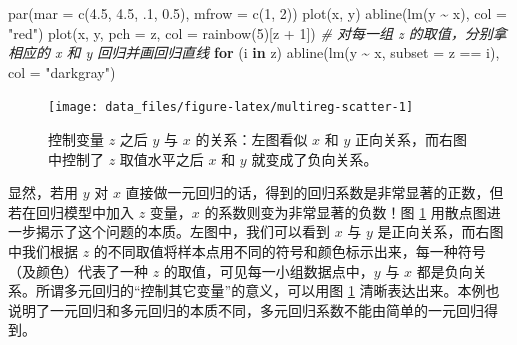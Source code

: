 \documentclass[
  b5paper,
  UTF8,twoside]{book}
\newenvironment{Shaded}{\begin{snugshade}}{\end{snugshade}}
\newcommand{\AttributeTok}[1]{\textcolor[rgb]{0.77,0.63,0.00}{#1}}
\newcommand{\CommentTok}[1]{\textcolor[rgb]{0.56,0.35,0.01}{\textit{#1}}}
\newcommand{\ControlFlowTok}[1]{\textcolor[rgb]{0.13,0.29,0.53}{\textbf{#1}}}
\newcommand{\DecValTok}[1]{\textcolor[rgb]{0.00,0.00,0.81}{#1}}
\newcommand{\FloatTok}[1]{\textcolor[rgb]{0.00,0.00,0.81}{#1}}
\newcommand{\FunctionTok}[1]{\textcolor[rgb]{0.00,0.00,0.00}{#1}}
\newcommand{\NormalTok}[1]{#1}
\newcommand{\SpecialCharTok}[1]{\textcolor[rgb]{0.00,0.00,0.00}{#1}}
\newcommand{\StringTok}[1]{\textcolor[rgb]{0.31,0.60,0.02}{#1}}
\begin{document}
\begin{Shaded}
\begin{Highlighting}[]
\FunctionTok{par}\NormalTok{(}\AttributeTok{mar =} \FunctionTok{c}\NormalTok{(}\FloatTok{4.5}\NormalTok{, }\FloatTok{4.5}\NormalTok{, .}\DecValTok{1}\NormalTok{, }\FloatTok{0.5}\NormalTok{), }\AttributeTok{mfrow =} \FunctionTok{c}\NormalTok{(}\DecValTok{1}\NormalTok{, }\DecValTok{2}\NormalTok{))}
\FunctionTok{plot}\NormalTok{(x, y)}
\FunctionTok{abline}\NormalTok{(}\FunctionTok{lm}\NormalTok{(y }\SpecialCharTok{\textasciitilde{}}\NormalTok{ x), }\AttributeTok{col =} \StringTok{"red"}\NormalTok{)}
\FunctionTok{plot}\NormalTok{(x, y, }\AttributeTok{pch =}\NormalTok{ z, }\AttributeTok{col =} \FunctionTok{rainbow}\NormalTok{(}\DecValTok{5}\NormalTok{)[z }\SpecialCharTok{+} \DecValTok{1}\NormalTok{])}
\CommentTok{\# 对每一组 z 的取值，分别拿相应的 x 和 y 回归并画回归直线}
\ControlFlowTok{for}\NormalTok{ (i }\ControlFlowTok{in}\NormalTok{ z) }\FunctionTok{abline}\NormalTok{(}\FunctionTok{lm}\NormalTok{(y }\SpecialCharTok{\textasciitilde{}}\NormalTok{ x, }\AttributeTok{subset =}\NormalTok{ z }\SpecialCharTok{==}\NormalTok{ i), }\AttributeTok{col =} \StringTok{"darkgray"}\NormalTok{)}
\end{Highlighting}
\end{Shaded}

\begin{figure}

{\centering \texttt{[image: data\_files/figure-latex/multireg-scatter-1]} 

}

\caption[控制变量 \(z\) 之后 \(y\) 与 \(x\) 的关系]{控制变量 \(z\) 之后 \(y\) 与 \(x\) 的关系：左图看似 \(x\) 和 \(y\) 正向关系，而右图中控制了 \(z\) 取值水平之后 \(x\) 和 \(y\) 就变成了负向关系。}\label{fig:multireg-scatter}
\end{figure}





显然，若用 \(y\) 对 \(x\) 直接做一元回归的话，得到的回归系数是非常显著的正数，但若在回归模型中加入 \(z\) 变量，\(x\) 的系数则变为非常显著的负数！图 \ref{fig:multireg-scatter} 用散点图进一步揭示了这个问题的本质。左图中，我们可以看到 \(x\) 与 \(y\) 是正向关系，而右图中我们根据 \(z\) 的不同取值将样本点用不同的符号和颜色标示出来，每一种符号（及颜色）代表了一种 \(z\) 的取值，可见每一小组数据点中，\(y\) 与 \(x\) 都是负向关系。所谓多元回归的``控制其它变量''的意义，可以用图 \ref{fig:multireg-scatter} 清晰表达出来。本例也说明了一元回归和多元回归的本质不同，多元回归系数不能由简单的一元回归得到。
\end{document}
